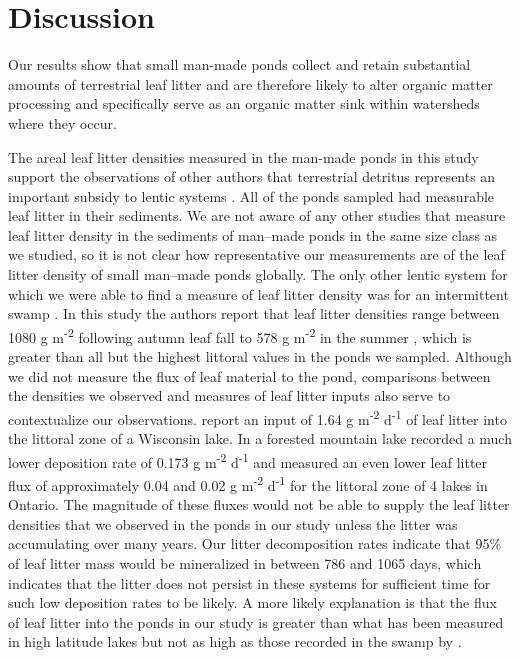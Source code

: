 \documentclass{article}
\begin{document}
\section{Discussion}

Our results show that small man-made ponds collect and retain substantial amounts of terrestrial leaf litter and are therefore likely to alter organic matter processing and specifically serve as an organic matter sink within watersheds where they occur.

The areal leaf litter densities measured in the man-made ponds in this study support the observations of other authors that terrestrial detritus represents an important subsidy to lentic systems \cite{Hodkinson_1975, Gasith_1976, RICHEY_1978, Marcarelli_2011}. All of the ponds sampled had measurable leaf litter in their sediments. We are not aware of any other studies that measure leaf litter density in the sediments of man--made ponds in the same size class as we studied, so it is not clear how representative our measurements are of the leaf litter density of small man--made ponds globally. The only other lentic system for which we were able to find a measure of leaf litter density was for an intermittent swamp \cite{Mehring_2014}. In this study the authors report that leaf litter densities range between 1080 g m\textsuperscript{-2} following autumn leaf fall to 578 g m\textsuperscript{-2} in the summer \cite{Mehring_2014}, which is greater than all but the highest littoral values in the ponds we sampled.  Although we did not measure the flux of leaf material to the pond, comparisons between the densities we observed and measures of leaf litter inputs also serve to contextualize our observations.  \cite{Gasith_1976} report an input of 1.64 g m\textsuperscript{-2} d\textsuperscript{-1} of leaf litter into the littoral zone of a Wisconsin lake.  In a forested mountain lake \cite{Rau_1976} recorded a much lower deposition rate of 0.173 g m\textsuperscript{-2} d\textsuperscript{-1} and \cite{France_1995} measured an even lower leaf litter flux of approximately 0.04 and 0.02 g m\textsuperscript{-2} d\textsuperscript{-1} for the littoral zone of 4 lakes in Ontario. The magnitude of these fluxes would not be able to supply the leaf litter densities that we observed in the ponds in our study unless the litter was accumulating over many years. Our litter decomposition rates indicate that 95\% of leaf litter mass would be mineralized in between 786 and 1065 days, which indicates that the litter does not persist in these systems for sufficient time for such low deposition rates to be likely. A more likely explanation is that the flux of leaf litter into the ponds in our study is greater than what has been measured in high latitude lakes but not as high as those recorded in the swamp by \cite{Mehring_2014}.  
\end{document}
